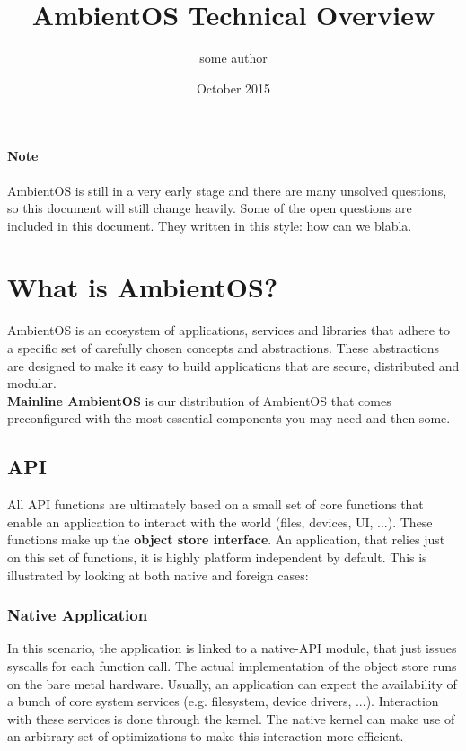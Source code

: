 \documentclass[a4paper]{article}
\title{AmbientOS Technical Overview}
\author{some author}
\date{October 2015}
\begin{document}
\maketitle

\paragraph{Note} AmbientOS is still in a very early stage and there are many unsolved questions, so this document will still change heavily. Some of the open questions are included in this document. They written in this style: {\q how can we blabla}.

\section{What is AmbientOS?}
AmbientOS is an ecosystem of applications, services and libraries that adhere to a specific set of carefully chosen concepts and abstractions. These abstractions are designed to make it easy to build applications that are secure, distributed and modular. \\
{\bf Mainline AmbientOS} is our distribution of AmbientOS that comes preconfigured with the most essential components you may need and then some.

\subsection{API}
All API functions are ultimately based on a small set of core functions that enable an application to interact with the world (files, devices, UI, ...). These functions make up the {\bf object store interface}. An application, that relies just on this set of functions, it is highly platform independent by default. This is illustrated by looking at both native and foreign cases:

\subsubsection{Native Application}
In this scenario, the application is linked to a native-API module, that just issues syscalls for each function call. The actual implementation of the object store runs on the bare metal hardware. Usually, an application can expect the availability of a bunch of core system services (e.g. filesystem, device drivers, ...). Interaction with these services is done through the kernel. The native kernel can make use of an arbitrary set of optimizations to make this interaction more efficient.
\end{document}
